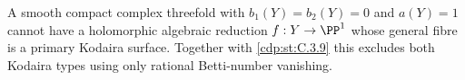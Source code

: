 \begin{proposition}\hypertarget{tag-01F5}{}\label{cdp:st:C.3.10}


A smooth compact complex threefold with $b_1(Y)=b_2(Y)=0$ and
$a(Y)=1$ cannot have a holomorphic algebraic reduction
$f:Y\to\PP^1$ whose general fibre is a primary Kodaira
surface. Together with \ref{cdp:st:C.3.9} this excludes both Kodaira
types using only rational Betti-number vanishing.
\end{proposition}


